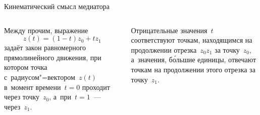 
\begin{frame}{Кинематический смысл медиатора}
\begin{columns}
Между прочим, выражение
	\[
	z(t)=(1-t)z_0+tz_1
	\]
задаёт закон равномерного прямолинейного движения, при котором точка
с~радиусом"=вектором~$z(t)$ в~момент времени~$t=0$ проходит через точку~$z_0$,
а~при~$t=1$~— через~$z_1$.

\bigskip

Отрицательные значения~$t$ соответствуют точкам, находящимся на продолжении
отрезка~$z_0z_1$ за точку~$z_0$, а~значения, бо́льшие единицы, отвечают точкам
на продолжении этого отрезка за точку~$z_1$.
\end{columns}
\end{frame}
